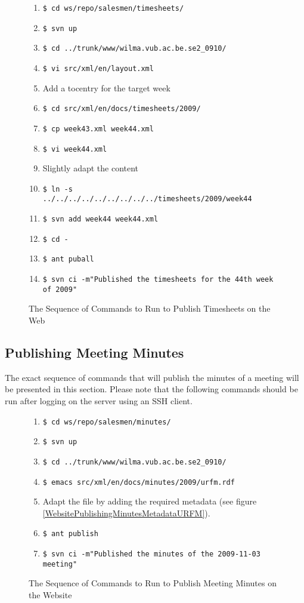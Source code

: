 \begin{figure}[hb]
\caption{The Sequence of Commands to Run to Publish Timesheets
on the Web}
\label{WebsitePublishingTimesheetsCommands}
\begin{enumerate}
\item \verb*#$ cd ws/repo/salesmen/timesheets/#
\item \verb*#$ svn up#
\item \verb*#$ cd ../trunk/www/wilma.vub.ac.be.se2_0910/#
\item \verb*#$ vi src/xml/en/layout.xml#
\item Add a tocentry for the target week
\item \verb*#$ cd src/xml/en/docs/timesheets/2009/#
\item \verb*#$ cp week43.xml week44.xml#
\item \verb*#$ vi week44.xml #
\item Slightly adapt the content
\item \verb*#$ ln -s ../../../../../../../../../timesheets/2009/week44#
\item \verb*#$ svn add week44 week44.xml#
\item \verb*#$ cd -#
\item \verb*#$ ant puball#
\item \verb*#$ svn ci -m"Published the timesheets for the 44th week of 2009"#
\end{enumerate}
\end{figure}

\subsection{Publishing Meeting Minutes}\label{WebsitePublishingMinutes}
The exact sequence of commands that will publish the minutes of a
meeting will be presented in this section. Please note that the following
commands should be run after logging on the server using an SSH client.

\begin{figure}[hb]
\caption{The Sequence of Commands to Run to Publish Meeting Minutes on the Website}
\label{WebsitePublishingMinutesCommands}
\begin{enumerate}
\item \verb*#$ cd ws/repo/salesmen/minutes/#
\item \verb*#$ svn up#
\item \verb*#$ cd ../trunk/www/wilma.vub.ac.be.se2_0910/#
\item \verb*#$ emacs src/xml/en/docs/minutes/2009/urfm.rdf#
\item Adapt the file by adding the required metadata (see figure \ref{WebsitePublishingMinutesMetadataURFM}).
\item \verb*#$ ant publish#
\item \verb*#$ svn ci -m"Published the minutes of the 2009-11-03 meeting"#
\end{enumerate}
\end{figure}

